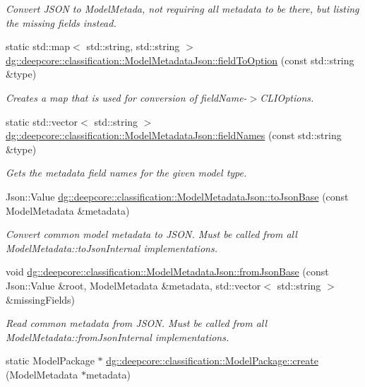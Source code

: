 \begin{DoxyCompactItemize}
\begin{DoxyCompactList}\small\item\em Convert J\+S\+ON to Model\+Metada, not requiring all metadata to be there, but listing the missing fields instead. \end{DoxyCompactList}\item 
static std\+::map$<$ std\+::string, std\+::string $>$ \hyperlink{group___classification_module_gafb0eba5c57e9b1b1aa4c806c038c4515}{dg\+::deepcore\+::classification\+::\+Model\+Metadata\+Json\+::field\+To\+Option} (const std\+::string \&type)
\begin{DoxyCompactList}\small\item\em Creates a map that is used for conversion of field\+Name-\/$>$C\+L\+I\+Options. \end{DoxyCompactList}\item 
static std\+::vector$<$ std\+::string $>$ \hyperlink{group___classification_module_gaa1a0da4f9b0c3e8a98ef29894910bc8d}{dg\+::deepcore\+::classification\+::\+Model\+Metadata\+Json\+::field\+Names} (const std\+::string \&type)
\begin{DoxyCompactList}\small\item\em Gets the metadata field names for the given model type. \end{DoxyCompactList}\item 
Json\+::\+Value \hyperlink{group___classification_module_ga5736fbf7a78314a0f6a86bf49c1ec55f}{dg\+::deepcore\+::classification\+::\+Model\+Metadata\+Json\+::to\+Json\+Base} (const Model\+Metadata \&metadata)
\begin{DoxyCompactList}\small\item\em Convert common model metadata to J\+S\+ON. Must be called from all Model\+Metadata\+::to\+Json\+Internal implementations. \end{DoxyCompactList}\item 
void \hyperlink{group___classification_module_ga7ebc89c602cc78bcb33689ee37edffac}{dg\+::deepcore\+::classification\+::\+Model\+Metadata\+Json\+::from\+Json\+Base} (const Json\+::\+Value \&root, Model\+Metadata \&metadata, std\+::vector$<$ std\+::string $>$ \&missing\+Fields)
\begin{DoxyCompactList}\small\item\em Read common metadata from J\+S\+ON. Must be called from all Model\+Metadata\+::from\+Json\+Internal implementations. \end{DoxyCompactList}\item 
static Model\+Package $\ast$ \hyperlink{group___classification_module_ga0c294e3def7dceac4acb48b191ee6df0}{dg\+::deepcore\+::classification\+::\+Model\+Package\+::create} (Model\+Metadata $\ast$metadata)

\end{DoxyCompactItemize}
